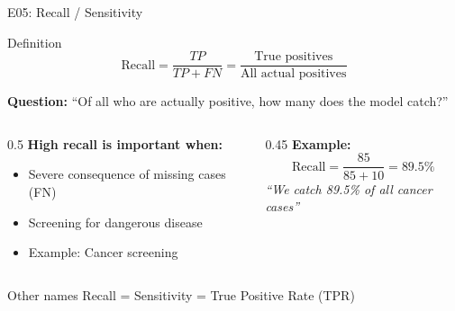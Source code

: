 \documentclass[aspectratio=169, 10pt]{beamer}
\begin{document}
\begin{frame}{E05: Recall / Sensitivity}
    
    \begin{block}{Definition}
        \[
        \text{Recall} = \frac{TP}{TP + FN} = \frac{\text{True positives}}{\text{All actual positives}}
        \]
    \end{block}
    
    \vspace{3mm}
    
    \textbf{Question:} ``Of all who are actually positive, how many does the model catch?''
    
    \vspace{3mm}
    
    \begin{columns}
        \begin{column}{0.5\textwidth}
            \textbf{High recall is important when:}
            \begin{itemize}
                \item Severe consequence of missing cases (FN)
                \item Screening for dangerous disease
                \item Example: Cancer screening
            \end{itemize}
        \end{column}
        
        \begin{column}{0.45\textwidth}
            \textbf{Example:}
            \[
            \text{Recall} = \frac{85}{85 + 10} = 89.5\%
            \]
            \textit{``We catch 89.5\% of all cancer cases''}
        \end{column}
    \end{columns}
    
    \vspace{2mm}

    \begin{block}{\footnotesize Other names}
        \footnotesize Recall = Sensitivity = True Positive Rate (TPR)
    \end{block}

\end{frame}
\end{document}
